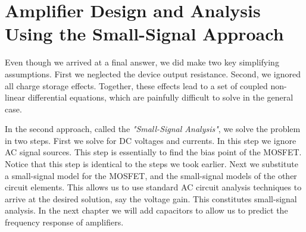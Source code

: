\section{Amplifier Design and Analysis Using the Small-Signal Approach}
Even though we arrived at a final answer, we did make two key simplifying assumptions.  First we neglected the device output resistance.  Second, we ignored all charge storage effects.  Together, these effects lead to a set of coupled non-linear differential equations, which are painfully difficult to solve in the general case.

In the second approach, called the \textit{"Small-Signal Analysis"}, we solve the problem in two steps.  First we solve for DC voltages and currents.  In this step we ignore AC signal sources.  This step is essentially to find the bias point of the MOSFET.  Notice that this step is identical to the steps we took earlier.  Next we substitute a small-signal model for the MOSFET, and the small-signal models of the other circuit elements.  This allows us to use standard AC circuit analysis techniques to arrive at the desired solution, say the voltage gain. This constitutes small-signal analysis.  In the next chapter we will add capacitors to allow us to predict the frequency response of amplifiers.
